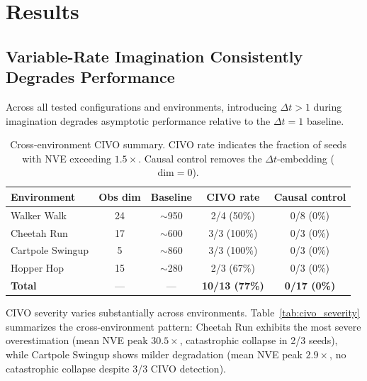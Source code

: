 \documentclass[10pt,letterpaper]{article}
\newcommand{\dt}{\Delta t}
\begin{document}
\section{Results}
\label{sec:results}

\subsection{Variable-Rate Imagination Consistently Degrades Performance}
\label{sec:c1}

Across all tested configurations and environments, introducing $\dt > 1$ during imagination degrades asymptotic performance relative to the $\dt = 1$ baseline.

\begin{table}[h]
\centering
\caption{Cross-environment CIVO summary. CIVO rate indicates the fraction of seeds with NVE exceeding $1.5\times$. Causal control removes the $\dt$-embedding ($\text{dim}=0$).}
\label{tab:cross_env_summary}
\begin{tabular}{lcccc}
\toprule
\textbf{Environment} & \textbf{Obs dim} & \textbf{Baseline} & \textbf{CIVO rate} & \textbf{Causal control} \\
\midrule
Walker Walk      & 24 & $\sim$950 & 2/4 (50\%)   & 0/8 (0\%) \\
Cheetah Run      & 17 & $\sim$600 & 3/3 (100\%)  & 0/3 (0\%) \\
Cartpole Swingup &  5 & $\sim$860 & 3/3 (100\%)  & 0/3 (0\%) \\
Hopper Hop       & 15 & $\sim$280 & 2/3 (67\%)   & 0/3 (0\%) \\
\midrule
\textbf{Total}   & ---  & ---      & \textbf{10/13 (77\%)} & \textbf{0/17 (0\%)} \\
\bottomrule
\end{tabular}
\end{table}

CIVO severity varies substantially across environments. Table~\ref{tab:civo_severity} summarizes the cross-environment pattern: Cheetah Run exhibits the most severe overestimation (mean NVE peak $30.5\times$, catastrophic collapse in 2/3 seeds), while Cartpole Swingup shows milder degradation (mean NVE peak $2.9\times$, no catastrophic collapse despite 3/3 CIVO detection).
\end{document}
